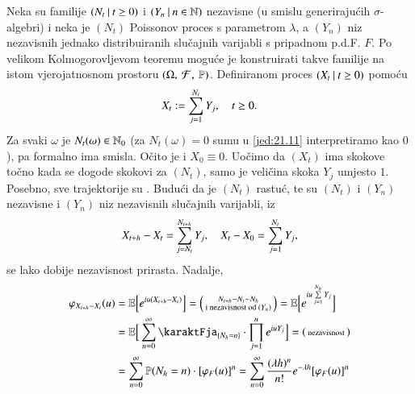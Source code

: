 \begin{pr}  \label{pr:21.10}
    Neka su familije $({N_t} \: | \: {t \geq 0})$ i $({Y_n } \: | \: {n \in \mathbb{N}})$ nezavisne (u smislu generiraju\' cih $\sigma$-algebri) i neka je $(N_t)$ Poissonov proces s parametrom $\lambda$, a $(Y_n)$ niz nezavisnih jednako distribuiranih slu\v cajnih varijabli s pripadnom p.d.F. $F$.
    Po velikom Kolmogorovljevom teoremu  mogu\' ce je konstruirati takve familije na istom vjerojatnosnom prostoru $(\Omega, \: \mathcal{F}, \: \mathbb{P})$.
    Definiranom proces $({X_t} \: | \: {t \geq 0})$ pomo\' cu
    \begin{equation}    \label{jed:21.11}
        X_t := \sum\limits_{j = 1}^{N_t} Y_j, \quad t \geq 0.
    \end{equation}
    Za svaki $\omega$ je $N_t(\omega) \in \mathbb{N}_0$ (za $N_t (\omega) = 0$ sumu u \eqref{jed:21.11} interpretiramo kao $0$), pa formalno ima smisla.
    O\v cito je i $X_0 \equiv 0$.
    Uo\v cimo da $(X_t)$ ima skokove to\v cno kada se dogode skokovi za $(N_t)$, samo je veli\v cina skoka $Y_j$ umjesto $1$.
    Posebno, sve trajektorije su \cadlag.
    Budu\' ci da je $(N_t)$ rastu\' c, te su $(N_t)$ i $(Y_n)$ nezavisne i $(Y_n)$ niz nezavisnih slu\v cajnih varijabli, iz
    \begin{equation*}
        X_{t + h} - X_t = \sum\limits_{j = N_t}^{N_{t+ h}} Y_j, \quad X_t - X_0 = \sum\limits_{j = 1}^{N_t} Y_j,
    \end{equation*}
    se lako dobije nezavisnost prirasta.
    Nadalje,
    \begin{equation}    \label{jed:21.12}
        \begin{aligned}
            \varphi_{X_{t + h} - X_t} (u) &= \masE \Big[ e^{i u (X_{t + h} - X_t)} \Big] =
            \begin{psmallmatrix}
                N_{t + h} - N_t \sim N_h\\
                \textnormal{i nezavisnost od } (Y_n)
            \end{psmallmatrix} = \masE \Big[ e^{i u \suma{j = 1}{N_h} Y_j} \Big]\\
            &= \masE \Big[ \suma{n = 0}{\infty} \karaktFja_{\{ N_h = n\}} \cdot \produkt{j = 1}{n} e^{i u Y_j} \Big] =
            \begin{psmallmatrix}
                \textnormal{nezavisnost}
            \end{psmallmatrix}\\
            &= \suma{n = 0}{\infty} \masP (N_h = n) \cdot [ \varphi_F (u) ]^n = \suma{n = 0}{\infty} \frac{(\lambda h)^n}{n!} e^{-\lambda h} [\varphi_F (u)]^n\\

\end{aligned}
\end{equation}
\end{pr}
